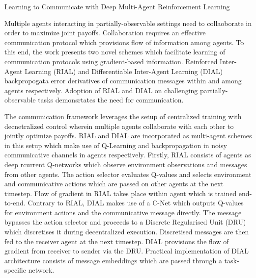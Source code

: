 \documentclass[11pt,letterpaper]{article}
\begin{document}
\begin{center}
  \large{Learning to Communicate with Deep Multi-Agent Reinforcement Learning}
\end{center}

Multiple agents interacting in partially-observable settings need to collaoborate in order to maximize joint payoffs. Collaboration requires an effective communication protocol which provisions flow of information among agents. To this end, the work presents two novel schemes which facilitate learning of communication protocols using gradient-based information. Reinforced Inter-Agent Learning (RIAL) and  Differentiable Inter-Agent Learning (DIAL) backpropogata error derivatives of communication messages within and among agents respectively. Adoption of RIAL and DIAL on challenging partially-observable tasks demonsrtates the need for communication. 

The communication framework leverages the setup of centralized training with decnetralized control wherein multiple agents collaborate with each other to jointly optimize payoffs. RIAL and DIAL are incorporated as multi-agent schemes in this setup which make use of Q-Learning and backpropagation in noisy communicative channels in agents respectively. Firstly, RIAL consists of agents as deep rcurrent Q-networks  which observe environment observations and messages from other agents. The action selector evaluates Q-values and selects environment and communicative actions which are passed on other agents at the next timestep. Flow of gradient in RIAL takes place within agent which is trained end-to-end. Contrary to RIAL, DIAL makes use of a C-Net which outputs Q-values for environment actions and the communicative message directly. The message bypasses the action selector and proceeds to a Discrete Regularised Unit (DRU) which discretises it during decentralized execution. Discretised messages are then fed to the receiver agent at the next timestep. DIAL provisions the flow of gradient from receiver to sender via the DRU. Practical implementation of DIAL architecture consists of message embeddings which are passed through a task-specific network.  
\end{document}
